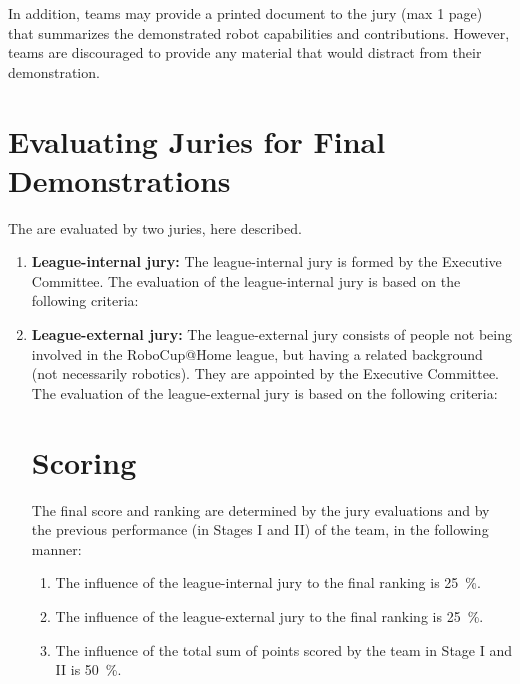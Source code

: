 In addition, teams may provide a printed document to the jury (max 1 page) that summarizes the demonstrated robot capabilities and contributions. However, teams are discouraged to provide any material that would distract from their demonstration.


\section{Evaluating Juries for Final Demonstrations}
The  are evaluated by two juries, here described.

\begin{enumerate}
\item\textbf{League-internal jury:} The league-internal jury is formed by the Executive Committee. The evaluation of the league-internal jury is based on the following criteria:

\item \textbf{League-external jury:} The league-external jury consists of people not being involved in the RoboCup@Home league, but having a related background (not necessarily robotics). They are appointed by the Executive Committee. The evaluation of the league-external jury is based on the following criteria:

\section{Scoring}
The final score and ranking are determined by the jury evaluations and by the previous performance (in Stages I and II) of the team, in the following manner:
  
\begin{enumerate}
  \item The influence of the league-internal jury to the final ranking is \SI{25}{\percent}.
  \item The influence of the league-external jury to the final ranking is \SI{25}{\percent}.
  \item The influence of the total sum of points scored by the team in Stage I and II is \SI{50}{\percent}.
\end{enumerate}


\end{enumerate}
